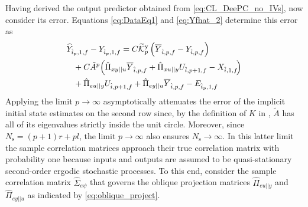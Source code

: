 Having derived the output predictor obtained from \eqref{eq:CL_DeePC_no_IVs}, now consider its error. Equations \eqref{eq:DataEq1} and \eqref{eq:Yfhat_2} determine this error as
%
\begin{align}
    \begin{split}
        &\widehat{Y}_{\hat{i}_p,1,f}-Y_{\hat{i}_p,1,f} = C\tKp{y}\left(\overline{Y}_{\hat{i},p,f}-Y_{\hat{i},p,f}\right)\\
        &\;\;\;+C\tilde{A}^p\!\left(\hat{\Pi}_{xy||u}\overline{Y}_{\hat{i},p,f}+\hat{\Pi}_{xu||y} U_{\hat{i},p+1,f}-X_{\hat{i},1,f}\!\right)\\
        &\;\;\;+\hat{\Pi}_{eu||y}U_{\hat{i},p+1,f}+\hat{\Pi}_{ey||u}\overline{Y}_{\hat{i},p,f}-E_{\hat{i}_p,1,f}
    \end{split}\label{eq:Yf_error1}%
\end{align}
Applying the limit $p\rightarrow\infty$ asymptotically attenuates the error of the implicit initial state estimates on the second row since, by the definition of $K$ in , $\tilde{A}$ has all of its eigenvalues strictly inside the unit circle. Moreover, since $N_\mathrm{s}=(p+1)r+pl$, the limit $p\rightarrow\infty$ also ensures $N_\mathrm{s}\rightarrow\infty$. In this latter limit the sample correlation matrices approach their true correlation matrix with probability one because inputs and outputs are assumed to be quasi-stationary second-order ergodic stochastic processes. To this end, consider the sample correlation matrix $\hat{\Sigma}_{e\psi}$ that governs the oblique projection matrices $\hat{\Pi}_{eu||y}$ and $\hat{\Pi}_{ey||u}$ as indicated by \eqref{eq:oblique_project}.
